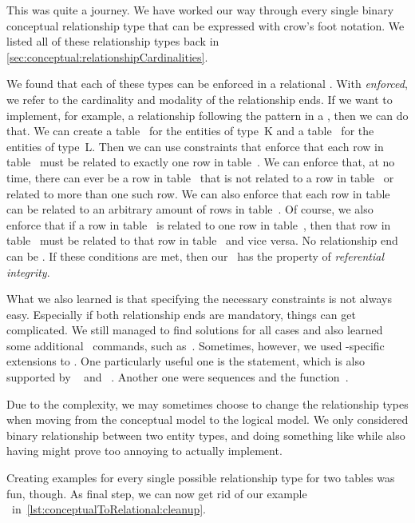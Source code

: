%
%
%
%
%
This was quite a journey.
We have worked our way through every single binary conceptual relationship type that can be expressed with crow's foot notation.
We listed all of these relationship types back in \cref{sec:conceptual:relationshipCardinalities}.

We found that each of these types can be enforced in a relational \dbms.
With \emph{enforced}, we refer to the cardinality and modality of the relationship ends.
If we want to implement, for example, a relationship following the pattern  in a \dbms, then we can do that.
We can create a table~ for the entities of type~K and a table~ for the entities of type~L.
Then we can use constraints that enforce that each row in table~ must be related to exactly one row in table~.
We can enforce that, at no time, there can ever be a row in table~ that is not related to a row in table~ or related to more than one such row.
We can also enforce that each row in table~ can be related to an arbitrary amount of rows in table~.
Of course, we also enforce that if a row in table~ is related to one row in table~, then that row in table~ must be related to that row in table~ and vice versa.
No relationship end can be .
If these conditions are met, then our \db\ has the property of \emph{referential integrity}.

What we also learned is that specifying the necessary constraints is not always easy.
Especially if both relationship ends are mandatory, things can get complicated.
We still managed to find solutions for all cases and also learned some additional \sql\ commands, such as~.
Sometimes, however, we used \postgresql-specific extensions to \sql.
One particularly useful one is the  statement, which is also supported by \mariadb~\cite{M:MSD:IR} and \sqlite~\cite{HWACIS:R}.
Another one were sequences and the  function~\cite{PGDG:PD:CS,PGDG:PD:SMF}.

Due to the complexity, we may sometimes choose to change the relationship types when moving from the conceptual model to the logical model.
We only considered binary relationship between two entity types, and doing something like  while also having  might prove too annoying to actually implement.

Creating examples for every single possible relationship type for two tables was fun, though.
As final step, we can now get rid of our example \db\ in~\cref{lst:conceptualToRelational:cleanup}.%
%
\endhsection%
